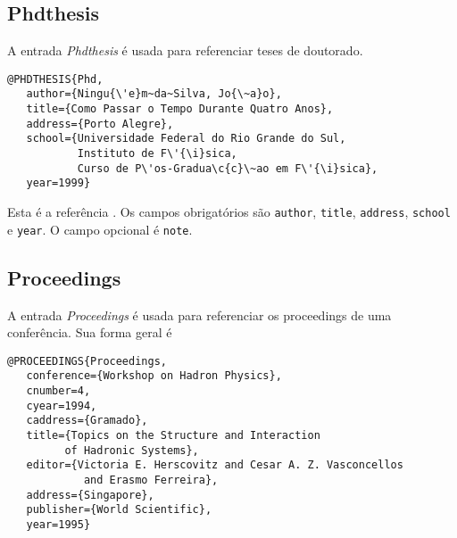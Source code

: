 \documentclass[a4paper,12pt]{article}
\newcommand{\ca}{\c{c}\~ao}
\newcommand{\enf}{\em}
\begin{document}
\subsection*{Phdthesis}

A entrada {\enf Phdthesis} \'e usada para referenciar teses de doutorado.
\begin{verbatim}
@PHDTHESIS{Phd,
   author={Ningu{\'e}m~da~Silva, Jo{\~a}o},
   title={Como Passar o Tempo Durante Quatro Anos},
   address={Porto Alegre},
   school={Universidade Federal do Rio Grande do Sul,
           Instituto de F\'{\i}sica,
           Curso de P\'os-Gradua\c{c}\~ao em F\'{\i}sica},
   year=1999}
\end{verbatim}
Esta \'e a refer\^encia \cite{Phd}.
Os campos obrigat\'orios s\~ao \verb+author+,
\verb+title+, \verb+address+, \verb+school+ e \verb+year+.
O campo opcional \'e \verb+note+.




\subsection*{Proceedings}

A entrada {\enf Proceedings} \'e usada para referenciar os proceedings de uma 
confer\^encia.
Sua forma geral \'e \cite{Proceedings}
\begin{verbatim}
@PROCEEDINGS{Proceedings,
   conference={Workshop on Hadron Physics},
   cnumber=4,
   cyear=1994,
   caddress={Gramado},
   title={Topics on the Structure and Interaction
         of Hadronic Systems},
   editor={Victoria E. Herscovitz and Cesar A. Z. Vasconcellos
            and Erasmo Ferreira},
   address={Singapore},
   publisher={World Scientific},
   year=1995}
\end{verbatim}




\begin{comment}
\subsection*{Techreport}

A entrada {\enf Techreport} \'e usada para referenciar um artigo
publicado por uma institui{\ca}.
Sua forma geral \'e \cite{Techreport}
\begin{verbatim}
\end{verbatim}



\subsection*{Unpublished}

A entrada {\enf Unpublished} \'e usada para referenciar um artigo
ainda n\~ao publicado.
Sua forma geral \'e \cite{Unpublished}
\begin{verbatim}
\end{verbatim}
\end{comment}
\end{document}
